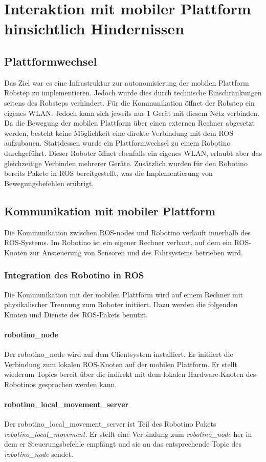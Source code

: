 \chapter{Interaktion mit mobiler Plattform hinsichtlich Hindernissen}
	\section{Plattformwechsel}
	Das Ziel war es eine Infrastruktur zur autonomisierung der mobilen Plattform Robstep zu implementieren. Jedoch wurde dies durch technische Einschränkungen seitens des Robsteps verhindert. Für die Kommunikation öffnet der Robstep ein eigenes WLAN. Jedoch kann sich jeweils nur 1 Gerät mit diesem Netz verbinden. Da die Bewegung der mobilen Plattform über einen externen Rechner abgesetzt werden, besteht keine Möglichkeit eine direkte Verbindung mit dem ROS aufzubauen. Stattdessen wurde ein Plattformwechsel zu einem Robotino durchgeführt. Dieser Roboter öffnet ebenfalls ein eigenes WLAN, erlaubt aber das gleichzeitige Verbinden mehrerer Geräte. Zusätzlich wurden für den Robotino bereits Pakete in ROS bereitgestellt, was die Implementierung von Bewegungsbefehlen erübrigt.

	\section{Kommunikation mit mobiler Plattform}
	Die Kommunikation zwischen ROS-nodes und Robotino verläuft innerhalb des ROS-Systems. Im Robotino ist ein eigener Rechner verbaut, auf dem ein ROS-Knoten zur Ansteuerung von Sensoren und des Fahrsystems betrieben wird.
		\subsection{Integration des Robotino in ROS}
		Die Kommunikation mit der mobilen Plattform wird auf einem Rechner mit physikalischer Trennung zum Roboter initiiert. Dazu werden die folgenden Knoten und Dienste des ROS-Pakets benutzt.
		\subsubsection{robotino\_node}
		Der robotino\_node wird auf dem Clientsystem installiert. Er initiiert die Verbindung zum lokalen ROS-Knoten auf der mobilen Plattform. Er stellt wiederum Topics bereit über die indirekt mit dem lokalen Hardware-Knoten des Robotinos gesprochen werden kann.
		\subsubsection{robotino\_local\_movement\_server}
		Der robotino\_local\_movement\_server ist Teil des Robotino Pakets \textit{robotino\_local\_movement}. Er stellt eine Verbindung zum \textit{robotino\_node} her in dem er Steuerungsbefehle empfängt und sie an das entsprechende Topic des \textit{robotino\_node} sendet.
